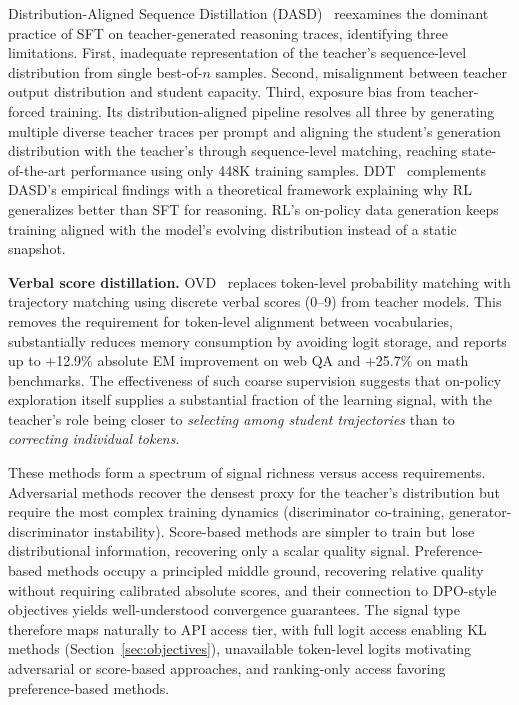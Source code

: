 \documentclass{article} %
\begin{document}
Distribution-Aligned Sequence Distillation (DASD)~\citep{2601.09088} reexamines the dominant practice of SFT on teacher-generated reasoning traces, identifying three limitations. First, inadequate representation of the teacher's sequence-level distribution from single best-of-$n$ samples. Second, misalignment between teacher output distribution and student capacity. Third, exposure bias from teacher-forced training. Its distribution-aligned pipeline resolves all three by generating multiple diverse teacher traces per prompt and aligning the student's generation distribution with the teacher's through sequence-level matching, reaching state-of-the-art performance using only 448K training samples. DDT~\citep{2602.12222} complements DASD's empirical findings with a theoretical framework explaining why RL generalizes better than SFT for reasoning. RL's on-policy data generation keeps training aligned with the model's evolving distribution instead of a static snapshot.

\textbf{Verbal score distillation.} OVD~\citep{2601.21968} replaces token-level probability matching with trajectory matching using discrete verbal scores (0--9) from teacher models. This removes the requirement for token-level alignment between vocabularies, substantially reduces memory consumption by avoiding logit storage, and reports up to +12.9\% absolute EM improvement on web QA and +25.7\% on math benchmarks. The effectiveness of such coarse supervision suggests that on-policy exploration itself supplies a substantial fraction of the learning signal, with the teacher's role being closer to \emph{selecting among student trajectories} than to \emph{correcting individual tokens}.

These methods form a spectrum of signal richness versus access requirements. Adversarial methods recover the densest proxy for the teacher's distribution but require the most complex training dynamics (discriminator co-training, generator-discriminator instability). Score-based methods are simpler to train but lose distributional information, recovering only a scalar quality signal. Preference-based methods occupy a principled middle ground, recovering relative quality without requiring calibrated absolute scores, and their connection to DPO-style objectives yields well-understood convergence guarantees. The signal type therefore maps naturally to API access tier, with full logit access enabling KL methods (Section~\ref{sec:objectives}), unavailable token-level logits motivating adversarial or score-based approaches, and ranking-only access favoring preference-based methods.
\end{document}
